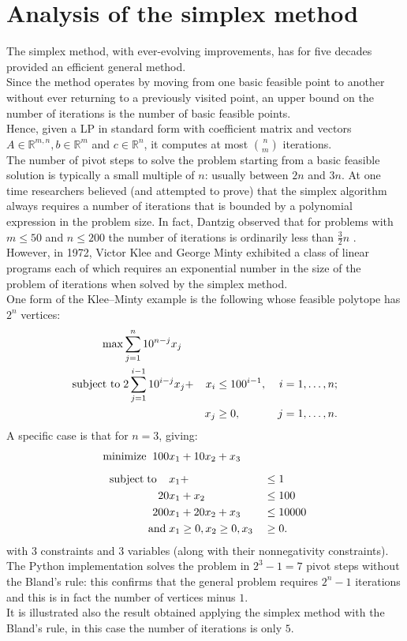 \documentclass[a4paper,10 pt,titlepage,twoside]{book}
\theoremstyle{plain}
\theoremstyle{definition}
\theoremstyle{remark}
\begin{document}
 \section{Analysis of the simplex method}
The simplex method, with ever-evolving improvements, has for five decades provided an efficient general
method. \\
 Since the method operates by moving from one basic feasible point
to another without ever returning to a previously visited point, an upper bound
on the number of iterations is the number of basic feasible points.\\Hence, given a LP in standard form with
coefficient matrix and vectors $A\in\mathbb{R}^{m,n}, b\in\mathbb{R}^{m}$ and $c\in\mathbb{R}^{n}$, it computes at most $n\choose m$ iterations.\\
The number of pivot steps to solve
the problem starting from a basic feasible solution is typically a small multiple of
$n$: usually between $2n$ and $3n$. At one time researchers believed (and attempted to prove) that the simplex algorithm always requires a number of iterations that is
bounded by a polynomial expression in the problem size. In fact, Dantzig observed that for problems with
$m \leq 50$ and $n \leq 200$ the number of iterations is ordinarily less than $\frac{3}{2}n$ \cite{DAN}.
\\ However, in 1972, Victor Klee and George Minty exhibited a class of linear programs each of which requires an
exponential number in the size of the problem of iterations when solved by the simplex method.\\
One form of the Klee–Minty example is the following whose feasible polytope has $2^{n}$
vertices:
\begin{alignat*}{4}
\max &\sum_{j=1}^{n}10^{n-j}x_{j}&&&\\
\text{subject to\;}&2\sum_{j=1}^{i-1}10^{i-j}x_{j}+&x_{i}&\leq 100^{i-1}, \, &i = 1,\dots, n;\\
&&x_{j}&\geq 0, \,&j = 1,\dots, n.\\
\end{alignat*}
A specific case is that for $n = 3$, giving:
\begin{alignat*}{2}
\text{minimize\;}\; 100& x_1+10x_2+ x_3&&\\[2mm]
\text{subject\;to\;\;\;\;} &x_1+&&\leq 1\\
						20& x_1+x_2&&\leq 100\\
200 &x_1 +20x_2 +x_{3}&&\leq 10000\\
\text{and}\;& x_1\geq 0,x_2\geq 0,x_3&&\geq 0.
\end{alignat*}
with 3 constraints and 3 variables (along with their nonnegativity constraints).\\
The Python implementation solves the problem in $2^{3} - 1 = 7$ pivot steps without the Bland's rule: this confirms that the general problem requires $2^{n}- 1$ iterations and this is in fact
the number of vertices minus $1$.\cite{MINTY}\\ It is illustrated also the result obtained applying the simplex method with the Bland's rule, in this case the number of iterations is only $5$.  \\
\end{document}
